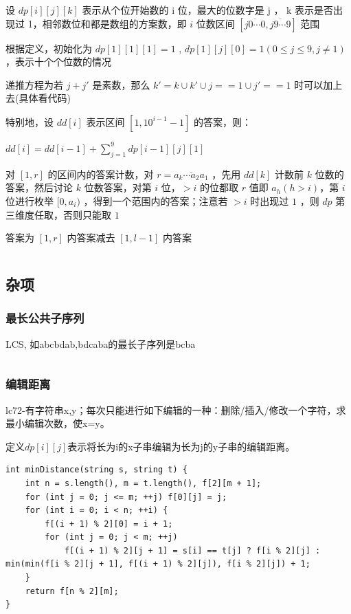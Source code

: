 \documentclass[twocolumn,10pt]{ctexart}
\begin{document}
设 $dp[i][j][k]$ 表示从个位开始数的 i 位，最大的位数字是 j ， k 表示是否出现过 1，相邻数位和都是数组的方案数，即 $i$ 位数区间 $[\overline{j0\cdots 0},\allowbreak{}\overline{j9\cdots 9}]$ 范围

根据定义，初始化为 $dp[1][1][1]=1$ , $dp[1][j][0]=1 (0\le j\le 9,\allowbreak{} j\neq 1)$ ，表示十个个位数的情况

递推方程为若 $j+j'$ 是素数，那么 $k'=k\cup k'\cup j==1\cup j'==1$  时可以加上去(具体看代码)

特别地，设 $dd[i]$ 表示区间 $[1,10^{i-1}-1]$ 的答案，则：

\begin{adjustbox}{max width=\linewidth,center}
$dd[i]=dd[i-1]+\sum_{j=1}^9dp[i-1][j][1]$
\end{adjustbox}

对 $[1, r]$ 的区间内的答案计数，对 $r=\overline{a_k\cdots a_2a_1}$ ，先用 $dd[k]$ 计数前 $k$ 位数的答案，然后讨论 $k$ 位数答案，对第 $i$ 位，$> i$ 的位都取 $r$ 值即 $a_h(h > i)$，第 $i$ 位进行枚举 $[0, a_i)$ ，得到一个范围内的答案；注意若 $> i$ 时出现过 $1$ ，则 $dp$ 第三维度任取，否则只能取 $1$

答案为 $[1,r]$ 内答案减去 $[1,l-1]$ 内答案

\inputminted{cpp}{code/nk2022w5D_dp_on_digit.cpp}

\subsection{杂项}

\subsubsection{最长公共子序列}

LCS, 如abcbdab,bdcaba的最长子序列是bcba

\inputminted{cpp}{code/ext_055.cpp}

\subsubsection{编辑距离}

\begin{notebox}
lc72-有字符串x,y；每次只能进行如下编辑的一种：删除/插入/修改一个字符，求最小编辑次数，使x=y。
\end{notebox}

定义$dp[i][j]$表示将长为i的x子串编辑为长为j的y子串的编辑距离。

\begin{verbatim}
int minDistance(string s, string t) {
    int n = s.length(), m = t.length(), f[2][m + 1];
    for (int j = 0; j <= m; ++j) f[0][j] = j;
    for (int i = 0; i < n; ++i) {
        f[(i + 1) % 2][0] = i + 1;
        for (int j = 0; j < m; ++j)
            f[(i + 1) % 2][j + 1] = s[i] == t[j] ? f[i % 2][j] : min(min(f[i % 2][j + 1], f[(i + 1) % 2][j]), f[i % 2][j]) + 1;
    }
    return f[n % 2][m];
}
\end{verbatim}
\end{document}
